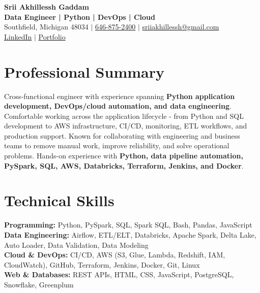 \documentclass[letterpaper,10pt]{article}
\begin{document}
\fontsize{9.35pt}{10.45pt}\selectfont

\begin{center}
    {\LARGE \textbf{Srii Akhillessh Gaddam}} \\[-1pt]
    \textbf{Data Engineer | Python | DevOps | Cloud} \\[2pt]
    Southfield, Michigan 48034 $|$
    \href{tel:6468752400}{646-875-2400} $|$
    \href{mailto:sriiakhillessh@gmail.com}{sriiakhillessh@gmail.com} \\[1pt]
    \href{https://www.linkedin.com/in/srii-akhiilessh-gaddam-b48668191/}{LinkedIn} $|$
    \href{https://sriiakhillesshg.github.io/portfolio/}{Portfolio}
\end{center}
\vspace{-8pt}

\section{Professional Summary}
\small{Cross-functional engineer with experience spanning \textbf{Python application development, DevOps/cloud automation, and data engineering}. Comfortable working across the application lifecycle - from Python and SQL development to AWS infrastructure, CI/CD, monitoring, ETL workflows, and production support. Known for collaborating with engineering and business teams to remove manual work, improve reliability, and solve operational problems. Hands-on experience with \textbf{Python, data pipeline automation, PySpark, SQL, AWS, Databricks, Terraform, Jenkins, and Docker}.}

\section{Technical Skills}
\small{
\textbf{Programming:} Python, PySpark, SQL, Spark SQL, Bash, Pandas, JavaScript \\
\textbf{Data Engineering:} Airflow, ETL/ELT, Databricks, Apache Spark, Delta Lake, Auto Loader, Data Validation, Data Modeling \\
\textbf{Cloud \& DevOps:} CI/CD, AWS (S3, Glue, Lambda, Redshift, IAM, CloudWatch), GitHub, Terraform, Jenkins, Docker, Git, Linux \\
\textbf{Web \& Databases:} REST APIs, HTML, CSS, JavaScript, PostgreSQL, Snowflake, Greenplum
}

\end{document}
